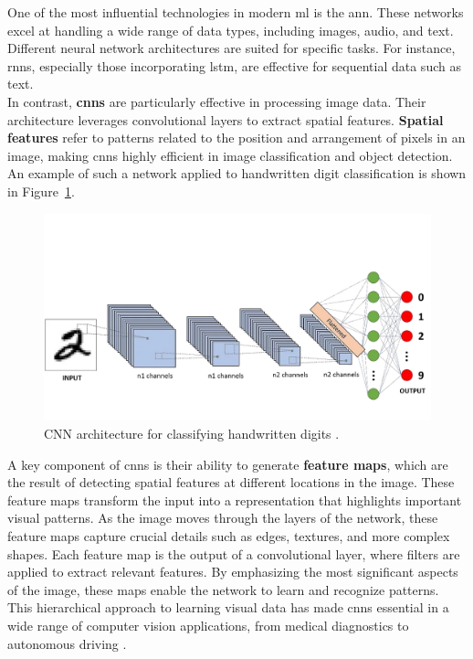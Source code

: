 One of the most influential technologies in modern \gls{ml} is the \gls{ann}. These networks excel at handling a wide range of data types, including images, audio, and text. Different neural network architectures are suited for specific tasks. For instance, \glspl{rnn}, especially those incorporating \gls{lstm}, are effective for sequential data such as text. \\

In contrast, \textbf{\glspl{cnn}} are particularly effective in processing image data. Their architecture leverages convolutional layers to extract spatial features. \textbf{Spatial features} refer to patterns related to the position and arrangement of pixels in an image, making \glspl{cnn} highly efficient in image classification and object detection. An example of such a network applied to handwritten digit classification is shown in Figure~\ref{fig:convolutional-neural-network}.  \\

\begin{figure}[h!] \centering \includegraphics[width=0.75\linewidth]{figures/theory/machine-learning/convolutional-neural-network.png} \caption[CNN architecture for handwritten digit classification]{CNN architecture for classifying handwritten digits \cite{medium:cnn}.} \label{fig:convolutional-neural-network} \end{figure}

A key component of \glspl{cnn} is their ability to generate \textbf{feature maps}, which are the result of detecting spatial features at different locations in the image. These feature maps transform the input into a representation that highlights important visual patterns. As the image moves through the layers of the network, these feature maps capture crucial details such as edges, textures, and more complex shapes. Each feature map is the output of a convolutional layer, where filters are applied to extract relevant features. By emphasizing the most significant aspects of the image, these maps enable the network to learn and recognize patterns. This hierarchical approach to learning visual data has made \glspl{cnn} essential in a wide range of computer vision applications, from medical diagnostics to autonomous driving \cite{encord:cnn}. \\

